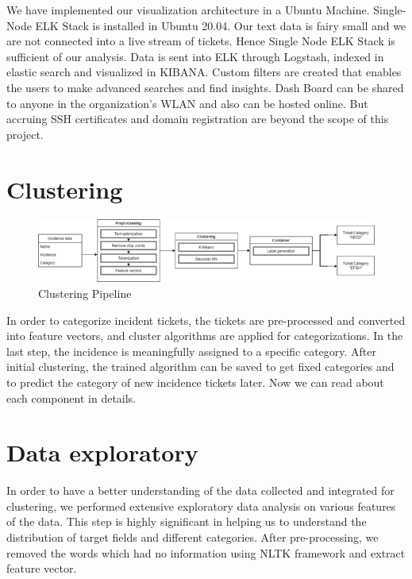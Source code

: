 \documentclass[a4paper,12pt]{report}
\begin{document}
    We have implemented our visualization architecture in a Ubuntu Machine. Single-Node ELK Stack\cite{ELKLog} is installed in Ubuntu 20.04. Our text data is fairy small and we are not connected into a live stream of tickets. Hence Single Node ELK Stack is sufficient of our analysis. Data is sent into ELK through Logstash, indexed in elastic search and visualized in KIBANA. Custom filters are created that enables the users to make advanced searches and find insights. 
    \newline
    Dash Board can be shared to anyone in the organization’s WLAN and also can be hosted online. But accruing SSH certificates and domain registration are beyond the scope of this project.


    \section{Clustering}
    \begin{figure}[!h]
        \includegraphics[width=\linewidth]{clustering_motho.png}
        \centering
        \caption{Clustering Pipeline}
    \end{figure}
    
    \noindent In order to categorize incident tickets, the tickets are pre-processed and converted into feature vectors, and cluster algorithms are applied for categorizations. In the last step, the incidence is meaningfully assigned to a specific category. After initial clustering, the trained algorithm can be saved to get fixed categories and to predict the category of new incidence tickets later. Now we can read about each component in details.
    \section{Data exploratory}
    In order to have a better understanding of the data collected and integrated for clustering, we performed extensive exploratory data analysis on various features of the data. This step is highly significant in helping us to understand the distribution of target fields and different categories. After pre-processing, we removed the words which had no information using NLTK framework and extract feature vector.
\end{document}
